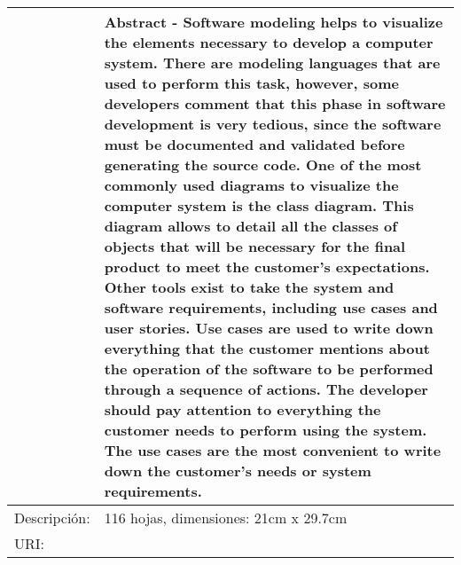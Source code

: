 \begin{table}[h!]
\begin{tabular}{| p{2.2cm} | p{12cm} |}
		& \textbf{{\small  Abstract - Software modeling helps to visualize the elements necessary to develop a computer system. There are modeling languages that are used to perform this task, however, some developers comment that this phase in software development is very tedious, since the software must be documented and validated before generating the source code. One of the most commonly used diagrams to visualize the computer system is the class diagram. This diagram allows to detail all the classes of objects that will be necessary for the final product to meet the customer's expectations. Other tools exist to take the system and software requirements, including use cases and user stories. Use cases are used to write down everything that the customer mentions about the operation of the software to be performed through a sequence of actions. The developer should pay attention to everything the customer needs to perform using the system. The use cases are the most convenient to write down the customer's needs or system requirements.}} \\
		\hline
		Descripción: & 116 hojas, dimensiones: 21cm x 29.7cm  \\ \hline
		URI: &   \\ \hline
	\end{tabular}
\end{table}

